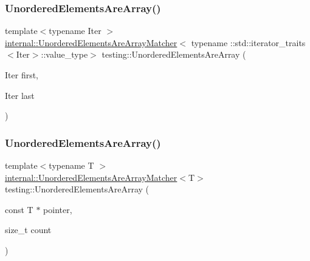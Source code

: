 \mbox{\label{namespacetesting_ab4896081406209171a1596b7028e1cf7}} 
\subsubsection{\texorpdfstring{Unordered\+Elements\+Are\+Array()}{UnorderedElementsAreArray()}\hspace{0.1cm}{\footnotesize\ttfamily [1/4]}}
{\footnotesize\ttfamily template$<$typename Iter $>$ \\
\hyperlink{classtesting_1_1internal_1_1_unordered_elements_are_array_matcher}{internal\+::\+Unordered\+Elements\+Are\+Array\+Matcher}$<$ typename \+::std\+::iterator\+\_\+traits$<$Iter$>$\+::value\+\_\+type$>$ testing\+::\+Unordered\+Elements\+Are\+Array (\begin{DoxyParamCaption}\item[{Iter}]{first,  }\item[{Iter}]{last }\end{DoxyParamCaption})\hspace{0.3cm}{\ttfamily [inline]}}

\mbox{\label{namespacetesting_a99b9509a7cd405be28bf45231577384b}} 
\subsubsection{\texorpdfstring{Unordered\+Elements\+Are\+Array()}{UnorderedElementsAreArray()}\hspace{0.1cm}{\footnotesize\ttfamily [2/4]}}
{\footnotesize\ttfamily template$<$typename T $>$ \\
\hyperlink{classtesting_1_1internal_1_1_unordered_elements_are_array_matcher}{internal\+::\+Unordered\+Elements\+Are\+Array\+Matcher}$<$T$>$ testing\+::\+Unordered\+Elements\+Are\+Array (\begin{DoxyParamCaption}\item[{const T $\ast$}]{pointer,  }\item[{size\+\_\+t}]{count }\end{DoxyParamCaption})\hspace{0.3cm}{\ttfamily [inline]}}

